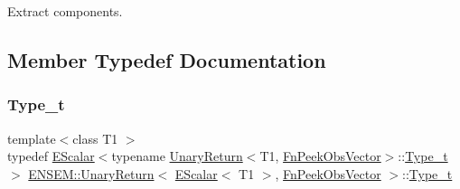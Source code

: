 Extract components. 

\subsection{Member Typedef Documentation}
\mbox{\label{structENSEM_1_1UnaryReturn_3_01EScalar_3_01T1_01_4_00_01FnPeekObsVector_01_4_ab344f63bc162dc2012f97d027b589de9}} 
\subsubsection{\texorpdfstring{Type\_t}{Type\_t}\hspace{0.1cm}{\footnotesize\ttfamily [1/2]}}
{\footnotesize\ttfamily template$<$class T1 $>$ \\
typedef \mbox{\hyperlink{classENSEM_1_1EScalar}{E\+Scalar}}$<$typename \mbox{\hyperlink{structENSEM_1_1UnaryReturn}{Unary\+Return}}$<$T1, \mbox{\hyperlink{structENSEM_1_1FnPeekObsVector}{Fn\+Peek\+Obs\+Vector}}$>$\+::\mbox{\hyperlink{structENSEM_1_1UnaryReturn_3_01EScalar_3_01T1_01_4_00_01FnPeekObsVector_01_4_ab344f63bc162dc2012f97d027b589de9}{Type\+\_\+t}}$>$ \mbox{\hyperlink{structENSEM_1_1UnaryReturn}{E\+N\+S\+E\+M\+::\+Unary\+Return}}$<$ \mbox{\hyperlink{classENSEM_1_1EScalar}{E\+Scalar}}$<$ T1 $>$, \mbox{\hyperlink{structENSEM_1_1FnPeekObsVector}{Fn\+Peek\+Obs\+Vector}} $>$\+::\mbox{\hyperlink{structENSEM_1_1UnaryReturn_3_01EScalar_3_01T1_01_4_00_01FnPeekObsVector_01_4_ab344f63bc162dc2012f97d027b589de9}{Type\+\_\+t}}}

\mbox{\label{structENSEM_1_1UnaryReturn_3_01EScalar_3_01T1_01_4_00_01FnPeekObsVector_01_4_ab344f63bc162dc2012f97d027b589de9}} 

